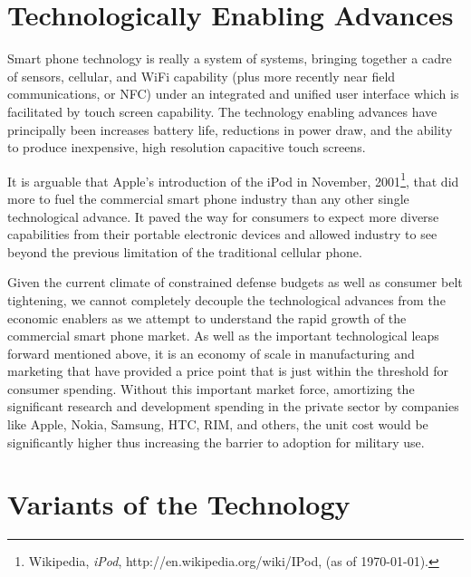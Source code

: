\documentclass[letterpaper,12pt]{article}
\begin{document}
\section*{Technologically Enabling Advances}
Smart phone technology is really a system of systems, bringing together a cadre of sensors, cellular, and WiFi capability (plus more recently near field communications, or NFC) under an integrated and unified user interface which is facilitated by touch screen capability.  The technology enabling advances have principally been increases battery life, reductions in power draw, and the ability to produce inexpensive, high resolution capacitive touch screens.

It is arguable that Apple's introduction of the iPod in November, 2001\footnote{Wikipedia, \emph{iPod}, http://en.wikipedia.org/wiki/IPod, (as of \today).}, that did more to fuel the commercial smart phone industry than any other single technological advance.  It paved the way for consumers to expect more diverse capabilities from their portable electronic devices and allowed industry to see beyond the previous limitation of the traditional cellular phone.

Given the current climate of constrained defense budgets as well as consumer belt tightening, we cannot completely decouple the technological advances from the economic enablers as we attempt to understand the rapid growth of the commercial smart phone market.  As well as the important technological leaps forward mentioned above, it is an economy of scale in manufacturing and marketing that have provided a price point that is just within the threshold for consumer spending.  Without this important market force, amortizing the significant research and development spending in the private sector by companies like Apple, Nokia, Samsung, HTC, RIM, and others, the unit cost would be significantly higher thus increasing the barrier to adoption for military use.

\section*{Variants of the Technology}
\end{document}
